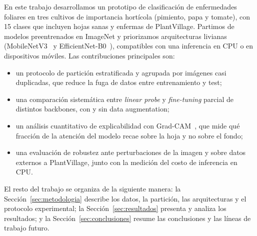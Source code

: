 En este trabajo desarrollamos un prototipo de clasificación de enfermedades foliares en
tres cultivos de importancia hortícola (pimiento, papa y tomate), con 15 clases que incluyen
hojas sanas y enfermas de PlantVillage. Partimos de modelos preentrenados en ImageNet y
priorizamos arquitecturas livianas (MobileNetV3~\cite{howard2019searching} y
EfficientNet-B0~\cite{tan2019efficientnet}), compatibles con una inferencia en CPU o en
dispositivos móviles. Las contribuciones principales son:
\begin{itemize}
  \item un protocolo de partición estratificada y agrupada por imágenes casi duplicadas, que
        reduce la fuga de datos entre entrenamiento y test;
  \item una comparación sistemática entre \emph{linear probe} y \emph{fine-tuning} parcial de
        distintos backbones, con y sin data augmentation;
  \item un análisis cuantitativo de explicabilidad con Grad-CAM~\cite{selvaraju2017gradcam},
        que mide qué fracción de la atención del modelo recae sobre la hoja y no sobre el fondo;
  \item una evaluación de robustez ante perturbaciones de la imagen y sobre datos externos a
        PlantVillage, junto con la medición del costo de inferencia en CPU.
\end{itemize}

El resto del trabajo se organiza de la siguiente manera: la Sección~\ref{sec:metodologia}
describe los datos, la partición, las arquitecturas y el protocolo experimental; la
Sección~\ref{sec:resultados} presenta y analiza los resultados; y la
Sección~\ref{sec:conclusiones} resume las conclusiones y las líneas de trabajo futuro.

